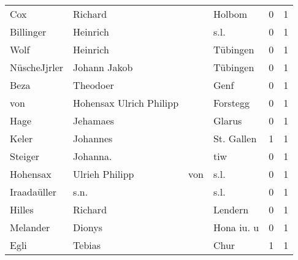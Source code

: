 \begin{tabular}{llllrr}
                      Cox &                            Richard &             &                                      Holbom &          0 &         1 \\
                Billinger &                           Heinrich &             &                                        s.l. &          0 &         1 \\
                     Wolf &                           Heinrich &             &                                    Tübingen &          0 &         1 \\
             NüscheJjrler &                       Johann Jakob &             &                                    Tübingen &          0 &         1 \\
                     Beza &                           Theodoer &             &                                        Genf &          0 &         1 \\
                      von &            Hohensax Ulrich Philipp &             &                                    Forstegg &          0 &         1 \\
                     Hage &                           Jehamaes &             &                                      Glarus &          0 &         1 \\
                    Keler &                           Johannes &             &                                  St. Gallen &          1 &         1 \\
                  Steiger &                           Johanna. &             &                                         tiw &          0 &         1 \\
                 Hohensax &                     Ulrieh Philipp &         von &                                        s.l. &          0 &         1 \\
              Iraadaüller &                               s.n. &             &                                        s.l. &          0 &         1 \\
                   Hilles &                            Richard &             &                                     Lendern &          0 &         1 \\
                 Melander &                             Dionys &             &                                  Hona iu. u &          0 &         1 \\
                     Egli &                             Tebias &             &                                        Chur &          1 &         1 \\

\end{tabular}
